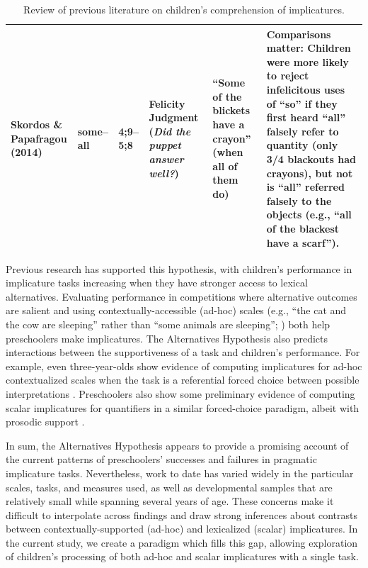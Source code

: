 \documentclass[man]{apa2}
\begin{document}
\begin{landscape}
\begin{table}
\begin{tabular}{| p{2.2cm} | p{2cm} | p{1.69cm} | p{4.5cm} | p{5cm} | p{7.2cm} |}
\parbox[t]{2.2cm}{Skordos \&\\Papafragou (2014)} & some--all & 4;9--5;8 & Felicity Judgment (\textit{Did the puppet answer well?}) & ``Some of the blickets have a crayon'' (when all of them do)  & Comparisons matter: Children were more likely to reject infelicitous uses of ``so'' if they first heard ``all'' falsely refer to quantity (only 3/4 blackouts had crayons), but not is ``all'' referred falsely to the objects (e.g., ``all of the blackest have a scarf'').\\ \hline \end{tabular} 
\caption{\label{tab:lit_review}Review of previous literature on children's comprehension of implicatures.} 
\end{table}
\end{landscape}
\restoregeometry

Previous research has supported this hypothesis, with children's performance in implicature tasks increasing when they have stronger access to lexical alternatives. Evaluating performance in competitions where alternative outcomes are salient \cite{papafragou2003} and using contextually-accessible (ad-hoc) scales (e.g., ``the cat and the cow are sleeping'' rather than ``some animals are sleeping''; ) both help preschoolers make implicatures. The Alternatives Hypothesis also predicts interactions between the supportiveness of a task and children's performance. For example, even three-year-olds show evidence of computing implicatures for ad-hoc contextualized scales when the task is a referential forced choice between possible interpretations \cite{stiller2014}.  Preschoolers also show some preliminary evidence of computing scalar implicatures for quantifiers in a similar forced-choice paradigm, albeit with prosodic support \cite{miller2005}. 

In sum, the Alternatives Hypothesis appears to provide a promising account of the current patterns of preschoolers' successes and failures in pragmatic implicature tasks. Nevertheless, work to date has varied widely in the particular scales, tasks, and measures used, as well as developmental samples that are relatively small while spanning several years of age. These concerns make it difficult to interpolate across findings and draw strong inferences about contrasts between contextually-supported (ad-hoc) and lexicalized (scalar) implicatures. In the current study, we create a paradigm which fills this gap, allowing exploration of children's processing of both ad-hoc and scalar implicatures with a single task.
\end{document}
